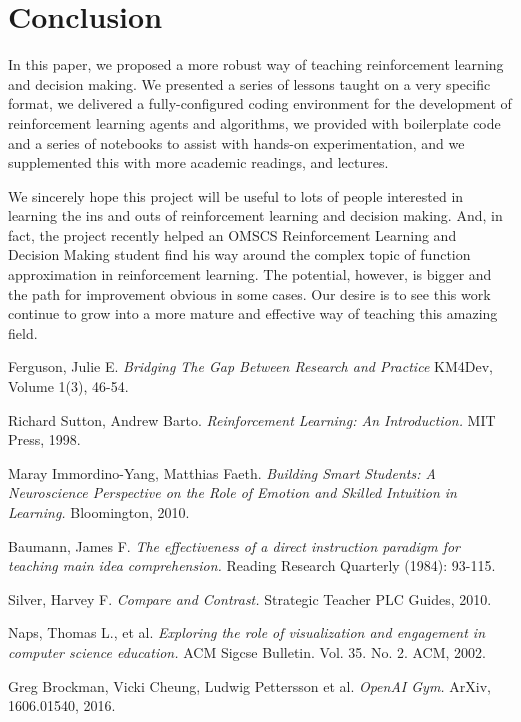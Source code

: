 \documentclass[11pt]{article} %
\begin{document}
\section{Conclusion}

In this paper, we proposed a more robust way of teaching reinforcement learning
and decision making. We presented a series of lessons taught on a very specific
format, we delivered a fully-configured coding environment for the development
of reinforcement learning agents and algorithms, we provided with boilerplate
code and a series of notebooks to assist with hands-on experimentation, and we
supplemented this with more academic readings, and lectures.

We sincerely hope this project will be useful to lots of people interested in
learning the ins and outs of reinforcement learning and decision making. And,
in fact, the project recently helped an OMSCS Reinforcement Learning and
Decision Making student find his way around the complex topic of function
approximation in reinforcement learning. The potential, however, is bigger and
the path for improvement obvious in some cases. Our desire is to see this
work continue to grow into a more mature and effective way of teaching this
amazing field.

\medskip
 
\begin{thebibliography}{9}

  Ferguson, Julie E.
  \textit{Bridging The Gap Between Research and Practice}
  KM4Dev, Volume 1(3), 46-54.
 
  Richard Sutton, Andrew Barto.
  \textit{Reinforcement Learning: An Introduction.}
  MIT Press, 1998.
 
  Maray Immordino-Yang, Matthias Faeth.
  \textit{Building Smart Students: A Neuroscience Perspective on the Role
    of Emotion and Skilled Intuition in Learning.}
  Bloomington, 2010.
 
  Baumann, James F.
  \textit{The effectiveness of a direct instruction paradigm for teaching main idea comprehension.}
  Reading Research Quarterly (1984): 93-115.
 
  Silver, Harvey F.
  \textit{Compare and Contrast.}
  Strategic Teacher PLC Guides, 2010.
 
  Naps, Thomas L., et al.
  \textit{Exploring the role of visualization and engagement in computer science education.}
  ACM Sigcse Bulletin. Vol. 35. No. 2. ACM, 2002.
 
  Greg Brockman, Vicki Cheung, Ludwig Pettersson et al.
  \textit{OpenAI Gym.}
  ArXiv, 1606.01540, 2016.
 
\end{thebibliography}
\end{document}
